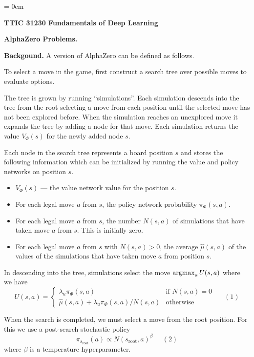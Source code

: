 

\parindent = 0em

\newcommand{\solution}[1]{\bigskip {\color{red} {\bf Solution}: #1}}




\centerline{\bf TTIC 31230 Fundamentals of Deep Learning}
\bigskip
\centerline{\bf AlphaZero Problems.}

\bigskip
\bigskip
{\bf Backgound.}
A version of AlphaZero can be defined as follows.

\medskip
To select a move in the game, first construct a search tree over possible moves to evaluate options.

\medskip
The tree is grown by running ``simulations''.  Each simulation descends into the tree from the root selecting a move from each position
until the selected move has not been explored before.  When the simulation reaches an unexplored move it expands the tree by adding a node for that move.
Each simulation returns the value $V_\Phi(s)$ for the newly added node $s$.

\medskip
Each node in the search tree represents a board position $s$ and stores the following information which can be initialized
by running the value and policy networks on position $s$.

\begin{itemize}
\item $V_\Phi(s)$ --- the value network value for the position $s$.
\item For each legal move $a$ from $s$, the policy network probability $\pi_\Phi(s,a)$.
\item For each legal move $a$ from $s$, the number $N(s,a)$ of simulations that have taken move $a$ from $s$. This is initially zero.
\item For each legal move $a$ from $s$ with $N(s,a) > 0$, the average $\hat{\mu}(s,a)$ of the values of the simulations that have
  taken move $a$ from position $s$.
\end{itemize}

\medskip
In descending into the tree, simulations select the move $\operatorname*{argmax}_a U(s,a)$ where we have
$$U(s,a) =  \left\{\begin{array}{ll}\lambda_u \pi_\Phi(s,a) &\mbox{if $N(s,a) = 0$} \\ \hat{\mu}(s,a) + \lambda_u \pi_\Phi(s,a)/N(s,a) & \mbox{otherwise} \end{array}\right.\;\;\;\;\;(1)$$

\medskip
When the search is completed, we must select a move from the root position.  For this we use a post-search stochastic policy
$$\pi_{s_{\mathrm{root}}}(a) \propto N(s_{\mathrm{root}},a)^\beta\;\;\;\;\;(2)$$
where $\beta$ is a temperature hyperparameter.

